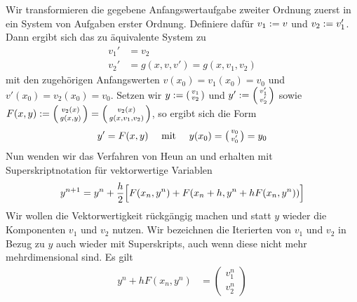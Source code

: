 \begin{exercisePage}
	Wir transformieren die gegebene Anfangswertaufgabe zweiter Ordnung zuerst in ein System von Aufgaben erster Ordnung. Definiere dafür $v_1 \defeq v$ und $v_2 \defeq v_1'$. Dann ergibt sich das zu  äquivalente System zu
	\begin{equation*}
		\begin{aligned}
		v_1' &= v_2 \\
		v_2' &= g(x,v,v') = g(x,v_1,v_2)
		\end{aligned}
	\end{equation*}
	mit den zugehörigen Anfangswerten $v(x_0) = v_1(x_0) = v_0$ und $v'(x_0) = v_2(x_0) = v_0$. Setzen wir $y \defeq \left( \begin{smallmatrix} v_1 \\ v_2 \end{smallmatrix} \right)$ und $y' \defeq \left( \begin{smallmatrix} v_1' \\ v_2' \end{smallmatrix} \right)$ sowie
	$F(x,y) \defeq \left( \begin{smallmatrix} v_2(x) \\ g(x,y) \end{smallmatrix} \right) = \left( \begin{smallmatrix} v_2(x) \\ g(x,v_1,v_2) \end{smallmatrix} \right)$, so ergibt sich die Form
	\begin{equation*}
		y' = F(x,y) \quad \mit \quad y(x_0) = \left( \begin{smallmatrix} v_0 \\ v_0' \end{smallmatrix} \right) = y_0
	\end{equation*}
	Nun wenden wir das Verfahren von Heun an und erhalten mit Superskriptnotation für vektorwertige Variablen
	\begin{equation*}
		y^{n+1} = y^n + \frac{h}{2} \Bigl[ F(x_n,y^n) + F(x_n + h , y^n + h F(x_n,y^n)) \Bigr]
	\end{equation*}
	Wir wollen die Vektorwertigkeit rückgängig machen und statt $y$ wieder die Komponenten $v_1$ und $v_2$ nutzen. Wir bezeichnen die Iterierten von $v_1$ und $v_2$ in Bezug zu $y$ auch wieder mit Superskripts, auch wenn diese nicht mehr mehrdimensional sind. Es gilt
	\begin{equation*}
		\begin{aligned}
		y^n + h F(x_n,y^n) 
		&=
		\begin{pmatrix} v_1^n \\ v_2^n \end{pmatrix}

\end{aligned}
\end{equation*}
\end{exercisePage}
